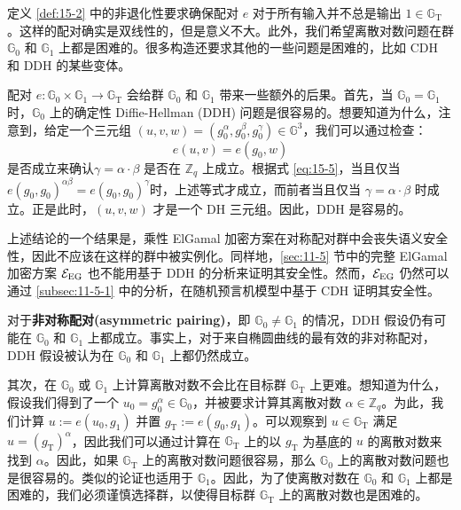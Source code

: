 定义 \ref{def:15-2} 中的非退化性要求确保配对 $e$ 对于所有输入并不总是输出 $1\in\mathbb{G}_\mathrm{T}$。这样的配对确实是双线性的，但是意义不大。此外，我们希望离散对数问题在群 $\mathbb{G}_0$ 和 $\mathbb{G}_1$ 上都是困难的。很多构造还要求其他的一些问题是困难的，比如 CDH 和 DDH 的某些变体。

\begin{snote}[直接的后果。]
配对 $e:\mathbb{G}_0\times\mathbb{G}_1\to\mathbb{G}_\mathrm{T}$ 会给群 $\mathbb{G}_0$ 和 $\mathbb{G}_1$ 带来一些额外的后果。首先，当 $\mathbb{G}_0=\mathbb{G}_1$ 时，$\mathbb{G}_0$ 上的确定性 Diffie-Hellman (DDH) 问题是很容易的。想要知道为什么，注意到，给定一个三元组 $(u,v,w)=(g_0^\alpha,g_0^\beta,g_0^\gamma)\in\mathbb{G}^3$，我们可以通过检查：
\[
e(u,v)=e(g_0,w)
\]
是否成立来确认$\gamma=\alpha\cdot\beta$ 是否在 $\mathbb{Z}_q$ 上成立。根据式 \ref{eq:15-5}，当且仅当$e(g_0,g_0)^{\alpha\beta}=e(g_0,g_0)^\gamma$时，上述等式才成立，而前者当且仅当 $\gamma=\alpha\cdot\beta$ 时成立。正是此时，$(u,v,w)$ 才是一个 DH 三元组。因此，DDH 是容易的。

上述结论的一个结果是，乘性 ElGamal 加密方案在对称配对群中会丧失语义安全性，因此不应该在这样的群中被实例化。同样地，\ref{sec:11-5} 节中的完整 ElGamal 加密方案 $\mathcal{E}_{\rm EG}$ 也不能用基于 DDH 的分析来证明其安全性。然而，$\mathcal{E}_{\rm EG}$ 仍然可以通过 \ref{subsec:11-5-1} 中的分析，在随机预言机模型中基于 CDH 证明其安全性。

对于\textbf{非对称配对(asymmetric pairing)}，即 $\mathbb{G}_0\neq\mathbb{G}_1$ 的情况，DDH 假设仍有可能在 $\mathbb{G}_0$ 和 $\mathbb{G}_1$ 上都成立。事实上，对于来自椭圆曲线的最有效的非对称配对，DDH 假设被认为在 $\mathbb{G}_0$ 和 $\mathbb{G}_1$ 上都仍然成立。

\vspace{5pt}

其次，在 $\mathbb{G}_0$ 或 $\mathbb{G}_1$ 上计算离散对数不会比在目标群 $\mathbb{G}_\mathrm{T}$ 上更难。想知道为什么，假设我们得到了一个 $u_0=g_0^\alpha\in\mathbb{G}_0$，并被要求计算其离散对数 $\alpha\in\mathbb{Z}_q$。为此，我们计算 $u:=e(u_0,g_1)$ 并置 $g_\mathrm{T}:=e(g_0,g_1)$。可以观察到 $u\in\mathbb{G}_\mathrm{T}$ 满足 $u=(g_\mathrm{T})^\alpha$，因此我们可以通过计算在 $\mathbb{G}_\mathrm{T}$ 上的以 $g_\mathrm{T}$ 为基底的 $u$ 的离散对数来找到 $\alpha$。因此，如果 $\mathbb{G}_\mathrm{T}$ 上的离散对数问题很容易，那么 $\mathbb{G}_0$ 上的离散对数问题也是很容易的。类似的论证也适用于 $\mathbb{G}_1$。因此，为了使离散对数在 $\mathbb{G}_0$ 和 $\mathbb{G}_1$ 上都是困难的，我们必须谨慎选择群，以使得目标群 $\mathbb{G}_\mathrm{T}$ 上的离散对数也是困难的。
\end{snote}

